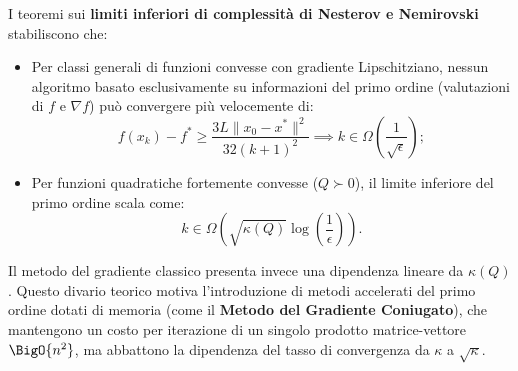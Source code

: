 I teoremi sui \textbf{limiti inferiori di complessit\`a di Nesterov e Nemirovski}~\cite{nesterov2004introductory} stabiliscono che:
\begin{itemize}
    \item Per classi generali di funzioni convesse con gradiente Lipschitziano, nessun algoritmo basato esclusivamente su informazioni del primo ordine (valutazioni di $f$ e $\nabla f$) pu\`o convergere pi\`u velocemente di:
    \begin{equation}
        f(x_k) - f^* \ge \frac{3 L \|x_0 - x^*\|^2}{32 (k + 1)^2} \implies k \in \Omega\left(\frac{1}{\sqrt{\epsilon}}\right);
    \end{equation}
    \item Per funzioni quadratiche fortemente convesse ($Q \succ 0$), il limite inferiore del primo ordine scala come:
    \begin{equation}
        k \in \Omega\left(\sqrt{\kappa(Q)} \log\left(\frac{1}{\epsilon}\right)\right).
    \end{equation}
\end{itemize}
Il metodo del gradiente classico presenta invece una dipendenza lineare da $\kappa(Q)$. Questo divario teorico motiva l'introduzione di metodi accelerati del primo ordine dotati di memoria (come il \textbf{Metodo del Gradiente Coniugato}), che mantengono un costo per iterazione di un singolo prodotto matrice-vettore $\BigO{n^2}$, ma abbattono la dipendenza del tasso di convergenza da $\kappa$ a $\sqrt{\kappa}$.
